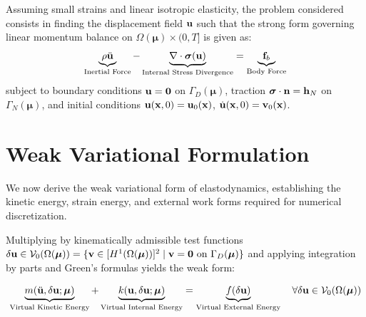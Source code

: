 Assuming small strains and linear isotropic elasticity, the problem considered consists in finding the displacement field $\mathbf{u}$ such that the strong form governing linear momentum balance on $\Omega(\boldsymbol{\mu}) \times (0, T]$ is given as:
\begin{equation}
    \underbrace{\rho \ddot{\mathbf{u}}}_{\text{Inertial Force}} - \underbrace{\nabla \cdot \boldsymbol{\sigma}(\mathbf{u})}_{\text{Internal Stress Divergence}} = \underbrace{\mathbf{f}_b}_{\text{Body Force}}
\end{equation}
subject to boundary conditions $\mathbf{u} = \mathbf{0}$ on $\Gamma_D(\boldsymbol{\mu})$, traction $\boldsymbol{\sigma}\cdot\mathbf{n} = \mathbf{h}_N$ on $\Gamma_N(\boldsymbol{\mu})$, and initial conditions $\mathbf{u}(\mathbf{x},0) = \mathbf{u}_0(\mathbf{x})$, $\dot{\mathbf{u}}(\mathbf{x},0) = \mathbf{v}_0(\mathbf{x})$.

\section{Weak Variational Formulation}

We now derive the weak variational form of elastodynamics, establishing the kinetic energy, strain energy, and external work forms required for numerical discretization.

Multiplying by kinematically admissible test functions $\delta\mathbf{u} \in \mathcal{V}_0(\Omega(\boldsymbol{\mu})) = \{ \mathbf{v} \in [H^1(\Omega(\boldsymbol{\mu}))]^2 \mid \mathbf{v} = \mathbf{0} \text{ on } \Gamma_D(\boldsymbol{\mu}) \}$ and applying integration by parts and Green's formulas yields the weak form:

\begin{equation}
    \underbrace{m(\ddot{\mathbf{u}}, \delta\mathbf{u}; \boldsymbol{\mu})}_{\text{Virtual Kinetic Energy}} + \underbrace{k(\mathbf{u}, \delta\mathbf{u}; \boldsymbol{\mu})}_{\text{Virtual Internal Energy}} = \underbrace{f(\delta\mathbf{u})}_{\text{Virtual External Energy}} \quad \forall \delta\mathbf{u} \in \mathcal{V}_0(\Omega(\boldsymbol{\mu}))
\end{equation}

